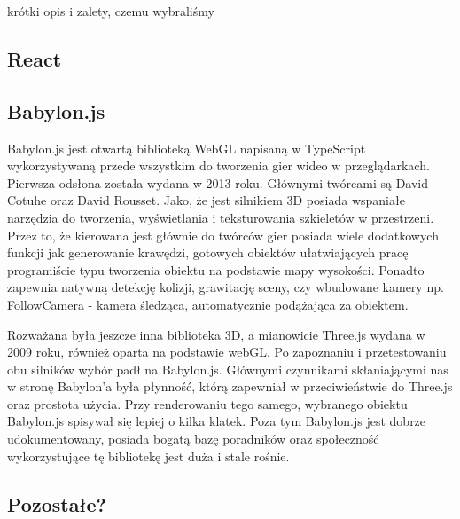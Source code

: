 \documentclass[11pt,a4paper,polish,thesis]{dcsbook}
\begin{document}
	krótki opis i zalety, czemu wybraliśmy
	
	\subsection{React}
	
		
	\subsection{Babylon.js}

	Babylon.js jest otwartą biblioteką WebGL napisaną w TypeScript wykorzystywaną przede wszystkim do tworzenia gier wideo w przeglądarkach. Pierwsza odsłona została wydana w 2013 roku. Głównymi twórcami są David Cotuhe oraz David Rousset. Jako, że jest silnikiem 3D posiada wspaniałe narzędzia do tworzenia, wyświetlania i teksturowania szkieletów w przestrzeni. Przez to, że kierowana jest głównie do twórców gier posiada wiele dodatkowych funkcji jak generowanie krawędzi, gotowych obiektów ułatwiających pracę programiście typu tworzenia obiektu na podstawie mapy wysokości. Ponadto zapewnia natywną detekcję kolizji, grawitację sceny, czy wbudowane kamery np. FollowCamera - kamera śledząca, automatycznie podążająca za obiektem. 
	
	Rozważana była jeszcze inna biblioteka 3D, a mianowicie Three.js wydana w 2009 roku, również oparta na podstawie webGL. Po zapoznaniu i przetestowaniu obu silników wybór padł na Babylon.js. Głównymi czynnikami skłaniającymi nas w stronę Babylon'a była płynność, którą zapewniał w przeciwieństwie do Three.js oraz prostota użycia. Przy renderowaniu tego samego, wybranego obiektu Babylon.js spisywał się lepiej o kilka klatek. Poza tym Babylon.js jest dobrze udokumentowany, posiada bogatą bazę poradników oraz społeczność wykorzystujące tę bibliotekę jest duża i stale rośnie.
	
	\subsection{Pozostałe?}
	
\end{document}
